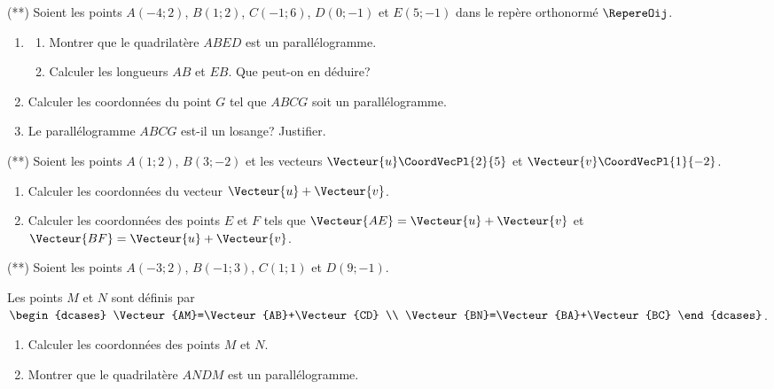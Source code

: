 \documentclass[a4paper]{article}
\begin{document}
\begin{exercice}{(**)}{}
Soient les points $A(-4;2)$, $B(1;2)$, $C(-1;6)$, $D(0;-1)$ et $E(5;-1)$ dans le repère orthonormé $\RepereOij$.
  \begin{enumerate}
    \item \begin{enumerate}
      \item Montrer que le quadrilatère $ABED$ est un parallélogramme.
      \item Calculer les longueurs $AB$ et $EB$. Que peut-on en déduire?
    \end{enumerate}
    \item Calculer les coordonnées du point $G$ tel que $ABCG$ soit un parallélogramme.
    \item Le parallélogramme $ABCG$ est-il un losange? Justifier.
  \end{enumerate}
\end{exercice}

\begin{exercice}{(**)}{}
  Soient les points $A(1;2)$, $B(3;-2)$ et les vecteurs $\Vecteur{u}\CoordVecPl{2}{5}$ et $\Vecteur{v}\CoordVecPl{1}{-2}$.

  \begin{enumerate}
    \item Calculer les coordonnées du vecteur $\Vecteur{u}+\Vecteur{v}$.
    \item Calculer les coordonnées des points $E$ et $F$ tels que $\Vecteur{AE}=\Vecteur{u}+\Vecteur{v}$ et $\Vecteur{BF}=\Vecteur{u}+\Vecteur{v}$.
  \end{enumerate}
\end{exercice}

\begin{exercice}{(**)}{}
  Soient les points $A(-3;2)$, $B(-1;3)$, $C(1;1)$ et $D(9;-1)$.

  Les points $M$ et $N$ sont définis par $\begin{dcases}
    \Vecteur{AM}=\Vecteur{AB}+\Vecteur{CD} \\
    \Vecteur{BN}=\Vecteur{BA}+\Vecteur{BC}  
  \end{dcases}$.

  \begin{enumerate}
    \item Calculer les coordonnées des points $M$ et $N$.
    \item Montrer que le quadrilatère $ANDM$ est un parallélogramme.
  \end{enumerate}
\end{exercice}
\end{document}
